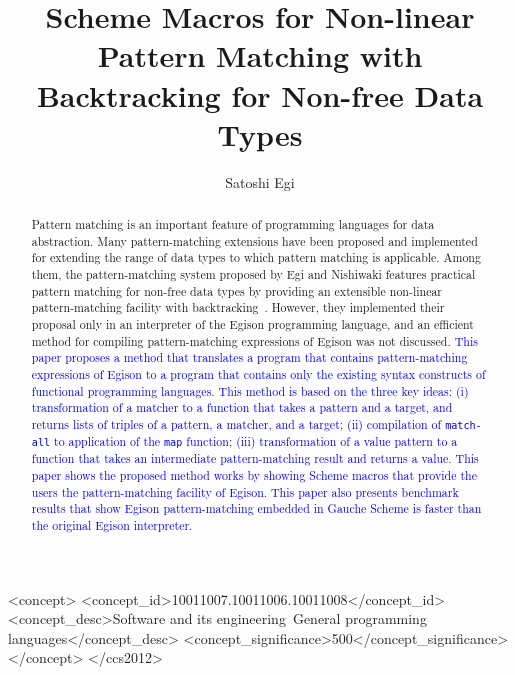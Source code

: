 \documentclass[acmlarge]{acmart}
\newcommand{\new}[1]{\textcolor{blue}{#1}}
\begin{document}
\setlength{\pdfpageheight}{\paperheight}
\setlength{\pdfpagewidth}{\paperwidth}

\title{Scheme Macros for Non-linear Pattern Matching with Backtracking for Non-free Data Types}

\author{Satoshi Egi}

\begin{abstract}
  Pattern matching is an important feature of programming languages for data abstraction.
  Many pattern-matching extensions have been proposed and implemented for extending the range of data types to which pattern matching is applicable.
  Among them, the pattern-matching system proposed by Egi and Nishiwaki features practical pattern matching for non-free data types by providing an extensible non-linear pattern-matching facility with backtracking~\cite{egi2018aplas}.
  However, they implemented their proposal only in an interpreter of the Egison programming language, and an efficient method for compiling pattern-matching expressions of Egison was not discussed.
  \new{
  This paper proposes a method that translates a program that contains pattern-matching expressions of Egison to a program that contains only the existing syntax constructs of functional programming languages.
  This method is based on the three key ideas: (i) transformation of a matcher to a function that takes a pattern and a target, and returns lists of triples of a pattern, a matcher, and a target; (ii) compilation of \texttt{match-all} to application of the \texttt{map} function; (iii) transformation of a value pattern to a function that takes an intermediate pattern-matching result and returns a value.
  This paper shows the proposed method works by showing Scheme macros that provide the users the pattern-matching facility of Egison.
  This paper also presents benchmark results that show Egison pattern-matching embedded in Gauche Scheme is faster than the original Egison interpreter.
  }%
\end{abstract}

\begin{CCSXML}
<concept>
<concept_id>10011007.10011006.10011008</concept_id>
<concept_desc>Software and its engineering~General programming languages</concept_desc>
<concept_significance>500</concept_significance>
</concept>
</ccs2012>
\end{CCSXML}
\end{document}
